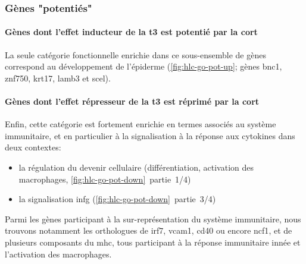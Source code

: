 \documentclass[../main.tex]{subfiles}
\begin{document}



\subsubsection{Gènes "potentiés"}

\paragraph{Gènes dont l'effet inducteur de la \gls{t3} est potentié par la \gls{cort}}
La seule catégorie fonctionnelle enrichie dans ce sous-ensemble de gènes correspond au développement de l'épiderme (\autoref{fig:hlc-go-pot-up}; gènes \gls{bnc1}, \gls{znf750}, \gls{krt17}, \gls{lamb3} et \gls{scel}).



\paragraph{Gènes dont l'effet répresseur de la \gls{t3} est réprimé par la \gls{cort}}\label{par:hlc-go-pot-down}
Enfin, cette catégorie est fortement enrichie en termes associés au système immunitaire, et en particulier à la signalisation à la réponse aux cytokines dans deux contextes:
\begin{itemize}
\item la régulation du devenir cellulaire (différentiation, activation des macrophages, \autoref{fig:hlc-go-pot-down}~partie~1/4)
\item la signalisation \gls{infg} (\autoref{fig:hlc-go-pot-down}~partie~3/4)
\end{itemize}



Parmi les gènes participant à la sur-représentation du système immunitaire, nous trouvons notamment les orthologues de \gls{irf7}, \gls{vcam1}, \gls{cd40} ou encore \gls{ncf1}, et de plusieurs composants du \gls{mhc}, tous participant à la réponse immunitaire innée et l'activation des macrophages.
\end{document}
